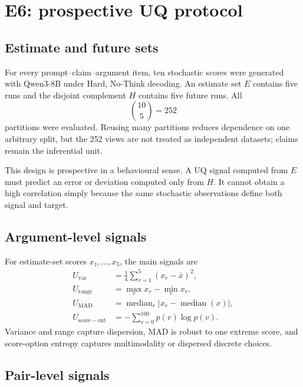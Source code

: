 \documentclass[11pt,twoside,a4paper]{report}
\begin{document}
\section{E6: prospective UQ protocol}
\label{sec:e6}

\subsection{Estimate and future sets}

For every prompt--claim--argument item, ten stochastic scores were generated with
Qwen3-8B under Hard, No-Think decoding.  An estimate set $E$ contains five runs and
the disjoint complement $H$ contains five future runs.  All
\begin{equation}
  \binom{10}{5}=252
\end{equation}
partitions were evaluated.  Reusing many partitions reduces dependence on one
arbitrary split, but the 252 views are not treated as independent datasets; claims
remain the inferential unit.

This design is prospective in a behavioural sense.  A UQ signal computed from $E$
must predict an error or deviation computed only from $H$.  It cannot obtain a high
correlation simply because the same stochastic observations define both signal and
target.

\subsection{Argument-level signals}

For estimate-set scores $x_1,\ldots,x_5$, the main signals are
\begin{align}
  U_{\mathrm{var}} &= \frac{1}{4}\sum_{r=1}^{5}(x_r-\bar x)^2,\\
  U_{\mathrm{range}} &= \max_r x_r-\min_r x_r,\\
  U_{\mathrm{MAD}} &= \operatorname{median}_r
  |x_r-\operatorname{median}(x)|,\\
  U_{\mathrm{score-ent}} &= -\sum_{v=0}^{100}p(v)\log p(v).
\end{align}
Variance and range capture dispersion, MAD is robust to one extreme score, and
score-option entropy captures multimodality or dispersed discrete choices.

\subsection{Pair-level signals}
\end{document}
